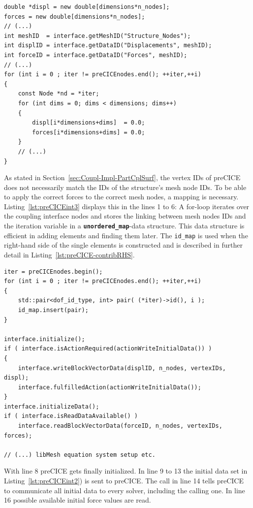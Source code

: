 \begin{lstlisting}[caption=preCICE Integration Part 2,label=lst:preCICEint2,keepspaces=true]
double *displ = new double[dimensions*n_nodes];
forces = new double[dimensions*n_nodes];
// (...)
int meshID  = interface.getMeshID("Structure_Nodes");
int displID = interface.getDataID("Displacements", meshID);
int forceID = interface.getDataID("Forces", meshID);
// (...)
for (int i = 0 ; iter != preCICEnodes.end(); ++iter,++i)
{
	const Node *nd = *iter;
	for (int dims = 0; dims < dimensions; dims++)
	{
		displ[i*dimensions+dims]  = 0.0;
		forces[i*dimensions+dims] = 0.0;
	}
	// (...)
}
\end{lstlisting}
   As stated in Section~\ref{sec:Coupl-Impl-PartCplSurf}, the vertex IDs of preCICE does not necessarily match the IDs of the structure's mesh node IDs. To be able to apply the correct forces to the correct mesh nodes, a mapping is necessary. Listing~\ref{lst:preCICEint3} displays this in the lines 1 to 6: A for-loop iterates over the coupling interface nodes and stores the linking between mesh nodes IDs and the iteration variable in a \texttt{\textbf{unordered\_map}}-data structure. This data structure is efficient in adding elements and finding them later. The \texttt{id\_map} is used when the right-hand side of the single elements is constructed and is described in further detail in Listing~\ref{lst:preCICE-contribRHS}.

\begin{lstlisting}[caption=preCICE Integration Part 3,label=lst:preCICEint3,keepspaces=true]
iter = preCICEnodes.begin();
for (int i = 0 ; iter != preCICEnodes.end(); ++iter,++i)
{
	std::pair<dof_id_type, int> pair( (*iter)->id(), i );
	id_map.insert(pair);
}

interface.initialize();
if ( interface.isActionRequired(actionWriteInitialData()) )
{
	interface.writeBlockVectorData(displID, n_nodes, vertexIDs, displ);
	interface.fulfilledAction(actionWriteInitialData());
}
interface.initializeData();
if ( interface.isReadDataAvailable() )
	interface.readBlockVectorData(forceID, n_nodes, vertexIDs, forces);

// (...) libMesh equation system setup etc.
\end{lstlisting}
   With line 8 preCICE gets finally initialized. In line 9 to 13 the initial data set in Listing~\ref{lst:preCICEint2}) is sent to preCICE. The call in line 14 tells preCICE to communicate all initial data to every solver, including the calling one. In line 16 possible available initial force values are read.
   
